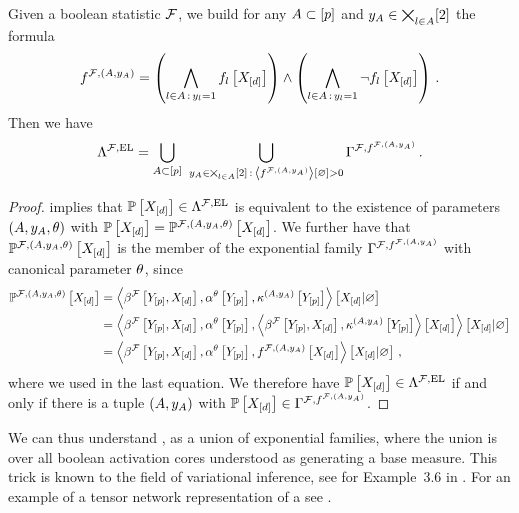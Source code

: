 \begin{theorem}
    Given a boolean statistic $\mathcal{F}$, we build for any $A\subset[p]$ and $y_{A}\in\bigtimes_{l\in A}[2]$ the formula
    \begin{align*} %
        \hlnformula =
        \left(\bigwedge_{\selindex\in\hardlegset\wcols\headindexof{\selindex}=1} \enumformulaat{\shortcatvariables}\right)
        \land
        \left(\bigwedge_{\selindex\in\hardlegset\wcols\headindexof{\selindex}=1} \lnot\enumformulaat{\shortcatvariables}\right) \, .
    \end{align*}
    Then we have
    \begin{align*}
        \Lambda^{\mathcal{F},\mathrm{EL}}
        = \bigcup_{A\subset[p]} \,\, \bigcup_{y_{A}\in\bigtimes_{l\in A}[2]\,:\,\left\langle f^{\mathcal{F},(A,y_{A})}\right\rangle \left[ \varnothing \right]>0} \Gamma^{\mathcal{F},f^{\mathcal{F},(A,y_{A})}} \, .
    \end{align*}
\end{theorem}
\begin{proof}
     implies that $\mathbb{P}\left[X_{[d]}\right]\in\Lambda^{\mathcal{F},\mathrm{EL}}$ is equivalent to the existence of parameters $(A,y_{A},\theta)$ with $\mathbb{P}\left[X_{[d]}\right]=\mathbb{P}^{\mathcal{F},(A,y_{A},\theta)}\left[X_{[d]}\right]$.
    We further have that $\mathbb{P}^{\mathcal{F},(A,y_{A},\theta)}\left[X_{[d]}\right]$ is the member of the exponential family $\Gamma^{\mathcal{F},f^{\mathcal{F},(A,y_{A})}}$ with canonical parameter $\theta$, since
    \begin{align*}
        \mathbb{P}^{\mathcal{F},(A,y_{A},\theta)}\left[X_{[d]}\right]
        &= \left\langle \beta^{\mathcal{F}}\left[Y_{[p]},X_{[d]}\right],\alpha^\theta\left[Y_{[p]}\right],\kappa^{(A,y_{A})}\left[Y_{[p]}\right]\right\rangle \left[ X_{[d]} | \varnothing \right] \\
        &= \left\langle \beta^{\mathcal{F}}\left[Y_{[p]},X_{[d]}\right],\alpha^\theta\left[Y_{[p]}\right],\left\langle \beta^{\mathcal{F}}\left[Y_{[p]},X_{[d]}\right],\kappa^{(A,y_{A})}\left[Y_{[p]}\right]\right\rangle \left[ X_{[d]} \right]\right\rangle \left[ X_{[d]} | \varnothing \right] \\
        &= \left\langle \beta^{\mathcal{F}}\left[Y_{[p]},X_{[d]}\right],\alpha^\theta\left[Y_{[p]}\right],f^{\mathcal{F},(A,y_{A})}\left[X_{[d]}\right]\right\rangle \left[ X_{[d]} | \varnothing \right] \, ,
    \end{align*}
    where we used  in the last equation.
    We therefore have $\mathbb{P}\left[X_{[d]}\right]\in\Lambda^{\mathcal{F},\mathrm{EL}}$ if and only if there is a tuple $(A,y_{A})$ with $\mathbb{P}\left[X_{[d]}\right]\in\Gamma^{\mathcal{F},f^{\mathcal{F},(A,y_{A})}}$.
\end{proof}

We can thus understand \HybridLogicNetworks{}, as a union of exponential families, where the union is over all boolean activation cores understood as generating a base measure.
This trick is known to the field of variational inference, see for Example~3.6 in \cite{wainwright_graphical_2008}.
For an example of a tensor network representation of a \HybridLogicNetwork{} see .

